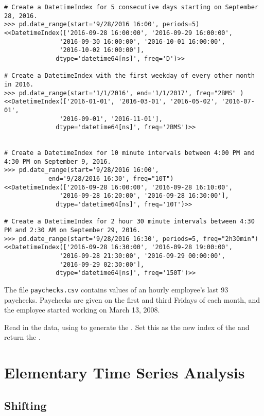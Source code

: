 \begin{lstlisting}
# Create a DatetimeIndex for 5 consecutive days starting on September 28, 2016.
>>> pd.date_range(start='9/28/2016 16:00', periods=5)
<<DatetimeIndex(['2016-09-28 16:00:00', '2016-09-29 16:00:00',
               '2016-09-30 16:00:00', '2016-10-01 16:00:00',
               '2016-10-02 16:00:00'],
              dtype='datetime64[ns]', freq='D')>>

# Create a DatetimeIndex with the first weekday of every other month in 2016.
>>> pd.date_range(start='1/1/2016', end='1/1/2017', freq="2BMS" )
<<DatetimeIndex(['2016-01-01', '2016-03-01', '2016-05-02', '2016-07-01',
               '2016-09-01', '2016-11-01'],
              dtype='datetime64[ns]', freq='2BMS')>>


# Create a DatetimeIndex for 10 minute intervals between 4:00 PM and 4:30 PM on September 9, 2016.
>>> pd.date_range(start='9/28/2016 16:00',
            end='9/28/2016 16:30', freq="10T")
<<DatetimeIndex(['2016-09-28 16:00:00', '2016-09-28 16:10:00',
               '2016-09-28 16:20:00', '2016-09-28 16:30:00'],
              dtype='datetime64[ns]', freq='10T')>>

# Create a DatetimeIndex for 2 hour 30 minute intervals between 4:30 PM and 2:30 AM on September 29, 2016.
>>> pd.date_range(start='9/28/2016 16:30', periods=5, freq="2h30min")
<<DatetimeIndex(['2016-09-28 16:30:00', '2016-09-28 19:00:00',
               '2016-09-28 21:30:00', '2016-09-29 00:00:00',
               '2016-09-29 02:30:00'],
              dtype='datetime64[ns]', freq='150T')>>
\end{lstlisting}

\begin{problem} %
The file \texttt{paychecks.csv} contains values of an hourly employee's last 93 paychecks.
Paychecks are given on the first and third Fridays of each month, and the employee started working on March 13, 2008.

Read in the data, using  to generate the .
Set this as the new index of the  and return the .
\end{problem}

\section*{Elementary Time Series Analysis}
\subsection*{Shifting}

